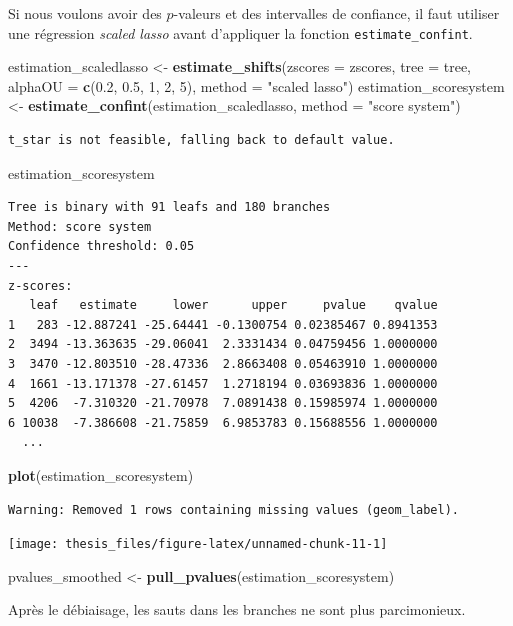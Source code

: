 \documentclass[12pt,a4paper]{reedthesis}
\newenvironment{Shaded}{\begin{snugshade}}{\end{snugshade}}
\newcommand{\DataTypeTok}[1]{\textcolor[rgb]{0.13,0.29,0.53}{#1}}
\newcommand{\DecValTok}[1]{\textcolor[rgb]{0.00,0.00,0.81}{#1}}
\newcommand{\FloatTok}[1]{\textcolor[rgb]{0.00,0.00,0.81}{#1}}
\newcommand{\KeywordTok}[1]{\textcolor[rgb]{0.13,0.29,0.53}{\textbf{#1}}}
\newcommand{\NormalTok}[1]{#1}
\newcommand{\StringTok}[1]{\textcolor[rgb]{0.31,0.60,0.02}{#1}}
\theoremstyle{definition}
\theoremstyle{definition}
\theoremstyle{definition}
\theoremstyle{remark}
\begin{document}
Si nous voulons avoir des \(p\)-valeurs et des intervalles de confiance, il faut utiliser une régression \emph{scaled lasso} avant d'appliquer la fonction \texttt{estimate\_confint}.
\begin{Shaded}
\begin{Highlighting}[]
\NormalTok{estimation_scaledlasso <-}\StringTok{ }
\StringTok{  }\KeywordTok{estimate_shifts}\NormalTok{(}\DataTypeTok{zscores =}\NormalTok{ zscores,}
                  \DataTypeTok{tree =}\NormalTok{ tree, }\DataTypeTok{alphaOU =} \KeywordTok{c}\NormalTok{(}\FloatTok{0.2}\NormalTok{, }\FloatTok{0.5}\NormalTok{, }\DecValTok{1}\NormalTok{, }\DecValTok{2}\NormalTok{, }\DecValTok{5}\NormalTok{),}
                  \DataTypeTok{method =} \StringTok{"scaled lasso"}\NormalTok{)}
\NormalTok{estimation_scoresystem <-}\StringTok{ }
\StringTok{  }\KeywordTok{estimate_confint}\NormalTok{(estimation_scaledlasso, }
                   \DataTypeTok{method =} \StringTok{"score system"}\NormalTok{)}
\end{Highlighting}
\end{Shaded}
\begin{verbatim}
t_star is not feasible, falling back to default value.
\end{verbatim}
\begin{Shaded}
\begin{Highlighting}[]
\NormalTok{estimation_scoresystem}
\end{Highlighting}
\end{Shaded}
\begin{verbatim}
Tree is binary with 91 leafs and 180 branches
Method: score system 
Confidence threshold: 0.05 
---
z-scores:
   leaf   estimate     lower      upper     pvalue    qvalue
1   283 -12.887241 -25.64441 -0.1300754 0.02385467 0.8941353
2  3494 -13.363635 -29.06041  2.3331434 0.04759456 1.0000000
3  3470 -12.803510 -28.47336  2.8663408 0.05463910 1.0000000
4  1661 -13.171378 -27.61457  1.2718194 0.03693836 1.0000000
5  4206  -7.310320 -21.70978  7.0891438 0.15985974 1.0000000
6 10038  -7.386608 -21.75859  6.9853783 0.15688556 1.0000000
  ...
\end{verbatim}
\begin{Shaded}
\begin{Highlighting}[]
\KeywordTok{plot}\NormalTok{(estimation_scoresystem)}
\end{Highlighting}
\end{Shaded}
\begin{verbatim}
Warning: Removed 1 rows containing missing values (geom_label).
\end{verbatim}
\begin{center}\texttt{[image: thesis\_files/figure-latex/unnamed-chunk-11-1]} \end{center}
\begin{Shaded}
\begin{Highlighting}[]
\NormalTok{pvalues_smoothed <-}\StringTok{ }\KeywordTok{pull_pvalues}\NormalTok{(estimation_scoresystem)}
\end{Highlighting}
\end{Shaded}
Après le débiaisage, les sauts dans les branches ne sont plus parcimonieux.
\end{document}
